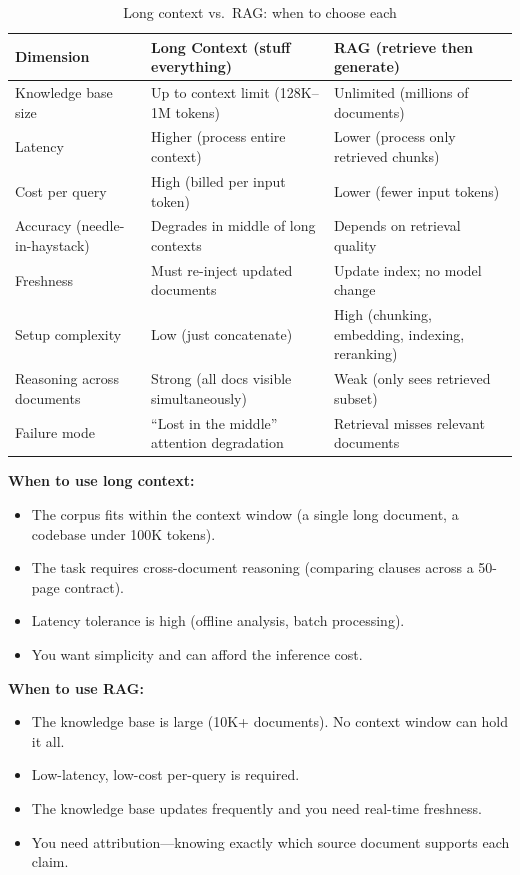 \begin{table}[H]
\centering
\caption{Long context vs.\ RAG: when to choose each}
\begin{tabularx}{\textwidth}{lXX}
\toprule
\textbf{Dimension} & \textbf{Long Context (stuff everything)} & \textbf{RAG (retrieve then generate)} \\
\midrule
Knowledge base size & Up to context limit (128K--1M tokens) & Unlimited (millions of documents) \\
Latency & Higher (process entire context) & Lower (process only retrieved chunks) \\
Cost per query & High (billed per input token) & Lower (fewer input tokens) \\
Accuracy (needle-in-haystack) & Degrades in middle of long contexts & Depends on retrieval quality \\
Freshness & Must re-inject updated documents & Update index; no model change \\
Setup complexity & Low (just concatenate) & High (chunking, embedding, indexing, reranking) \\
Reasoning across documents & Strong (all docs visible simultaneously) & Weak (only sees retrieved subset) \\
Failure mode & ``Lost in the middle'' attention degradation & Retrieval misses relevant documents \\
\bottomrule
\end{tabularx}
\end{table}

\textbf{When to use long context:}
\begin{itemize}
    \item The corpus fits within the context window (a single long document, a codebase under 100K tokens).
    \item The task requires cross-document reasoning (comparing clauses across a 50-page contract).
    \item Latency tolerance is high (offline analysis, batch processing).
    \item You want simplicity and can afford the inference cost.
\end{itemize}

\textbf{When to use RAG:}
\begin{itemize}
    \item The knowledge base is large (10K+ documents). No context window can hold it all.
    \item Low-latency, low-cost per-query is required.
    \item The knowledge base updates frequently and you need real-time freshness.
    \item You need attribution---knowing exactly which source document supports each claim.
\end{itemize}


